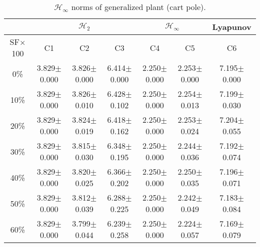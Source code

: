 \begin{table}[H]
\centering
\scriptsize
\begin{tabular}{| c || c | c | c | c | c | c |}
	\hline
	 & \multicolumn{3}{c|}{$\mathcal{H}_{2}$} & \multicolumn{2}{c|}{$\mathcal{H}_{\infty}$} & Lyapunov\\
	\hline
	SF$\times$100 & C1& C2 & C3 & C4 & C5 & C6\\
	\hline\hline
	0\% & 3.829$\pm$0.000 & 3.826$\pm$0.000 & 6.414$\pm$0.000 & 2.250$\pm$0.000 & 2.253$\pm$0.000 & 7.195$\pm$0.000\\
	\hline
	10\% & 3.829$\pm$0.000 & 3.826$\pm$0.010 & 6.428$\pm$0.102 & 2.250$\pm$0.000 & 2.254$\pm$0.013 & 7.199$\pm$0.030\\
	\hline
	20\% & 3.829$\pm$0.000 & 3.824$\pm$0.019 & 6.418$\pm$0.162 & 2.250$\pm$0.000 & 2.253$\pm$0.024 & 7.204$\pm$0.055\\
	\hline
	30\% & 3.829$\pm$0.000 & 3.815$\pm$0.030 & 6.348$\pm$0.195 & 2.250$\pm$0.000 & 2.244$\pm$0.036 & 7.192$\pm$0.074\\
	\hline
	40\% & 3.829$\pm$0.000 & 3.820$\pm$0.025 & 6.366$\pm$0.202 & 2.250$\pm$0.000 & 2.250$\pm$0.035 & 7.196$\pm$0.071\\
	\hline
	50\% & 3.829$\pm$0.000 & 3.812$\pm$0.039 & 6.288$\pm$0.225 & 2.250$\pm$0.000 & 2.242$\pm$0.049 & 7.183$\pm$0.084\\
	\hline
	60\% & 3.829$\pm$0.000 & 3.799$\pm$0.044 & 6.239$\pm$0.258 & 2.250$\pm$0.000 & 2.224$\pm$0.057 & 7.169$\pm$0.079\\
	\hline
\end{tabular}
\caption{$\mathcal{H}_{\infty}$ norms of generalized plant (cart pole).}
\label{table:hinfinity_norms_cart_pole:unc}
\end{table}

